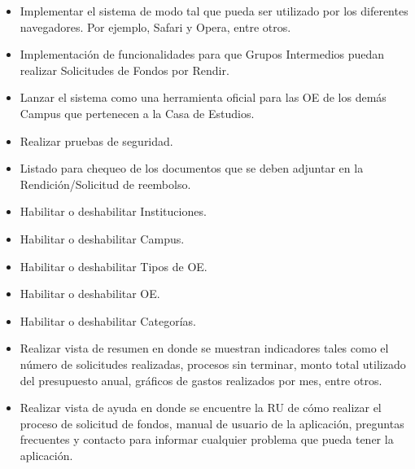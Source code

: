 \begin{itemize}
    \item Implementar el sistema de modo tal que pueda ser utilizado por los diferentes navegadores. Por ejemplo, Safari y Opera, entre otros.
    \item Implementación de funcionalidades para que Grupos Intermedios puedan realizar Solicitudes de Fondos por Rendir.
    \item Lanzar el sistema como una herramienta oficial para las OE de los demás Campus que pertenecen a la Casa de Estudios.
    \item Realizar pruebas de seguridad.
    \item Listado para chequeo de los documentos que se deben adjuntar en la Rendición/Solicitud de reembolso.
    \item Habilitar o deshabilitar Instituciones.
    \item Habilitar o deshabilitar Campus.
    \item Habilitar o deshabilitar Tipos de OE.
    \item Habilitar o deshabilitar OE.
    \item Habilitar o deshabilitar Categorías.
    \item Realizar vista de resumen en donde se muestran indicadores tales como el número de solicitudes realizadas, procesos sin terminar, monto total utilizado del presupuesto anual, gráficos de gastos realizados por mes, entre otros.
    \item Realizar vista de ayuda en donde se encuentre la RU de cómo realizar el proceso de solicitud de fondos, manual de usuario de la aplicación, preguntas frecuentes y contacto para informar cualquier problema que pueda tener la aplicación.
\end{itemize}
